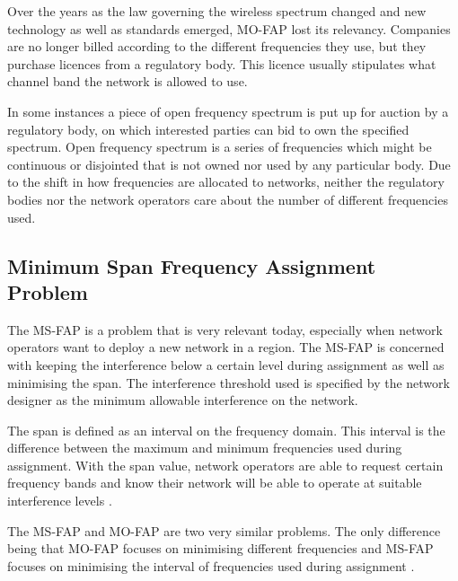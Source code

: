 Over the years as the law governing the wireless spectrum changed and new technology as well as standards emerged, \gls{MO-FAP} lost its relevancy\cite{Karen2004,MontemanniThesis}. Companies are no longer billed according to the different frequencies they use, but they purchase licences from a regulatory body\cite{Karen2004,MontemanniThesis}. This licence usually stipulates what channel band the network is allowed to use.

In some instances a piece of open frequency spectrum is put up for auction by a regulatory body, on which interested parties can bid to own the specified spectrum\cite{Karen2004,MontemanniThesis}. Open frequency spectrum is a series of frequencies which might be continuous or disjointed that is not owned nor used by any particular body. Due to the shift in how frequencies are allocated to networks, neither the regulatory bodies nor the network operators care about the number of different frequencies used\cite{Karen2004,MontemanniThesis}.
\subsection{Minimum Span Frequency Assignment Problem}
The \gls{MS-FAP} is a problem that is very relevant today, especially when network operators want to deploy a new network in a region\cite{Karen2004}. The \gls{MS-FAP} is concerned with keeping the interference below a certain level during assignment as well as minimising the span\cite{MSFAP}. The interference threshold used is specified by the network designer as the minimum allowable interference on the network\cite{MSFAP}.

The span is defined as an interval on the frequency domain. This interval is the difference between the maximum and minimum frequencies used during assignment\cite{Karen2004,MSFAP}. With the span value, network operators are able to request certain frequency bands and know their network will be able to operate at suitable interference levels \cite{Karen2004,MSFAP}.

The \gls{MS-FAP} and \gls{MO-FAP} are two very similar problems. The only difference being that \gls{MO-FAP} focuses on minimising different frequencies and \gls{MS-FAP} focuses on minimising the interval of frequencies used during assignment \cite{Karen2004}.

